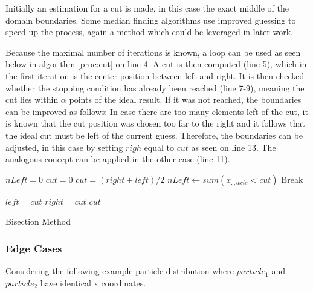 \documentclass[]{article}
\begin{document}
Initially an estimation for a cut is made, in this case the exact middle of the domain boundaries. Some median finding algorithms use improved guessing to speed up the process, again a method which could be leveraged in later work. 


Because the maximal number of iterations is known, a loop can be used as seen below in algorithm \ref{proc:cut} on line 4. A cut is then computed (line 5), which in the first iteration is the center position between left and right. It is then checked whether the stopping condition has already been reached (line 7-9), meaning the cut lies within $\alpha$ points of the ideal result. If it was not reached, the boundaries can be improved as follows: In case there are too many elements left of the cut, it is known that the cut position was chosen too far to the right and it follows that the ideal cut must be left of the current guess. Therefore, the boundaries can be adjusted, in this case by setting $righ$ equal to $cut$ as seen on line 13. The analogous concept can be applied in the other case (line 11). 

\begin{algorithm}[H]
		\begin{algorithmic}[1]
			\State $nLeft = 0$
			\State $cut = 0$
			\newline
			\State $cut = (right + left ) / 2 $
			\State $nLeft\gets sum(x_{:,axis} < cut)$ 
			\newline
			\State Break 
			\EndIf
			\newline
			
			\State $left = cut$
			\Else 
			\State $right = cut$
			\EndIf
			\newline
			\EndFor
			\State \Return $cut$
			\EndProcedure
		\end{algorithmic}
\caption{Bisection Method}
\label{proc:cut}
\end{algorithm}


\subsubsection{Edge Cases}

Considering the following example particle distribution where $particle_1$ and $particle_2$ have identical x coordinates. 
\end{document}
